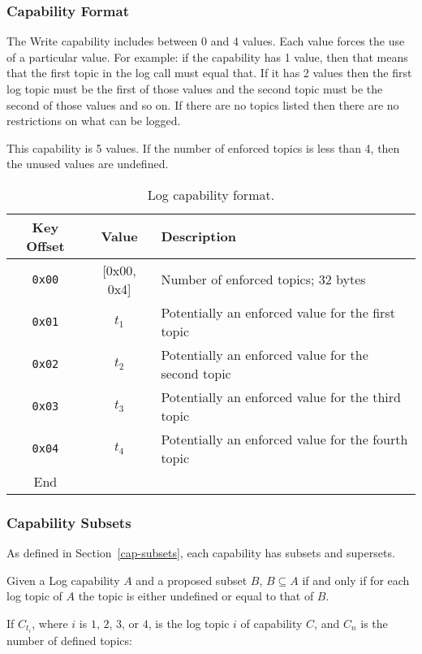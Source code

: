 \documentclass[english,a4paper]{article}
\let\oldparagraph\subsubsection
\renewcommand{\subsubsection}[1]{\oldparagraph{#1}\mbox{}}
\begin{document}
\subsubsection{Capability Format}
The Write capability includes between 0 and 4 values. Each value forces the use
of a particular value. For example: if the capability has 1 value, then that
means that the first topic in the log call must equal that. If it has 2 values
then the first log topic must be the first of those values and the second topic
must be the second of those values and so on. If there are no topics listed then
there are no restrictions on what can be logged.

This capability is 5 values. If the number of enforced topics is less than 4,
then the unused values are undefined.

\begin{table}[H]
  \caption{Log capability format.}
  \centering{}%
  \begin{tabularx}{\textwidth}{c|c|X}
    \hline
    Key Offset & Value & Description\\
    \hline
    \hline
    \texttt{0x00} & [0x00, 0x4] & Number of enforced topics; 32 bytes \\
    \texttt{0x01} & $t_1$ & Potentially an enforced value for the first topic
      \\
    \texttt{0x02} & $t_2$ & Potentially an enforced value for the second topic
      \\
    \texttt{0x03} & $t_3$ & Potentially an enforced value for the third topic
      \\
    \texttt{0x04} & $t_4$ & Potentially an enforced value for the fourth topic
      \\
    \hline
    End &  \\
    \hline
  \end{tabularx}
\end{table}

\subsubsection{Capability Subsets}
As defined in Section~\ref{cap-subsets}, each capability has subsets and
supersets.

Given a Log capability $A$ and a proposed subset $B$, $B \subseteq A$ if and
only if for each log topic of $A$ the topic is either undefined or equal to that
of $B$.

If $C_{t_i}$, where $i$ is $1$, $2$, $3$, or $4$, is the log topic $i$ of
capability $C$, and $C_n$ is the number of defined topics:
\end{document}
